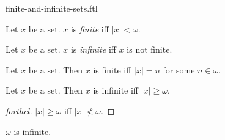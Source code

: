 \documentclass{naproche-library}
\begin{document}
\begin{smodule}[title=Finite and Infinite Sets]{finite-and-infinite-sets.ftl}

\begin{definition}[forthel,id=SET_THEORY_07_5346658235711488]
  Let $x$ be a set.
  $x$ is \emph{finite} iff $|x| < \omega$.
\end{definition}

\begin{definition}[forthel,id=SET_THEORY_07_8295412068777984]
  Let $x$ be a set.
  $x$ is \emph{infinite} iff $x$ is not finite.
\end{definition}

\begin{proposition}[forthel,id=SET_THEORY_07_3806229474312192]
  Let $x$ be a set.
  Then $x$ is finite iff $|x| = n$ for some $n \in \omega$.
\end{proposition}

\begin{proposition}[forthel,id=SET_THEORY_07_3174577070931968]
  Let $x$ be a set.
  Then $x$ is infinite iff $|x| \geq \omega$.
\end{proposition}
\begin{proof}[forthel]
  $|x| \geq \omega$ iff $|x| \nless \omega$.
\end{proof}

\begin{proposition}[forthel,id=SET_THEORY_07_9154385075632368]
  $\omega$ is infinite.
\end{proposition}
\end{smodule}
\end{document}
